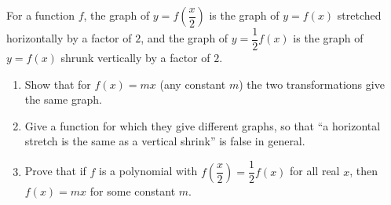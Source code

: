For a function $f$, the graph of $y=f\left(\dfrac {x}{2}\right)$ is the graph of $y=f(x)$ stretched horizontally by a factor of $2$, and the graph of $y=\dfrac{1}{2}f(x)$ is the graph of $y=f(x)$ shrunk vertically by a factor of $2$.
\begin{enumerate}
\item[(a)] Show that for $f(x)=mx$ (any constant $m$) the two transformations give the same graph.
\item[(b)] Give a function for which they give different graphs, so that ``a horizontal stretch is the same as a vertical shrink'' is false in general.
\item[(c)] Prove that if $f$ is a polynomial with $f\left(\dfrac {x}{2}\right)=\dfrac{1}{2}f(x)$ for all real $x$, then $f(x)=mx$ for some constant $m$.
\end{enumerate}
